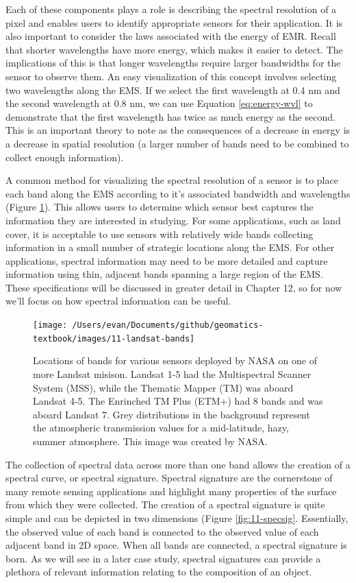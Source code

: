 \documentclass[
]{book}
\begin{document}
Each of these components plays a role is describing the spectral
resolution of a pixel and enables users to identify appropriate sensors
for their application. It is also important to consider the laws
associated with the energy of EMR. Recall that shorter wavelengths
have more energy, which makes it easier to detect. The implications
of this is that longer wavelengths require larger bandwidths for the
sensor to observe them. An easy visualization of this concept involves
selecting two wavelengths along the EMS. If we select the first
wavelength at 0.4 nm and the second wavelength at 0.8 nm, we can use
Equation \eqref{eq:energy-wvl} to demonstrate that the first wavelength
has twice as much energy as the second. This is an important theory
to note as the consequences of a decrease in energy is a decrease in
spatial resolution (a larger number of bands need to be combined to
collect enough information).

A common method for visualizing the spectral resolution of a sensor is
to place each band along the EMS according to it's associated bandwidth
and wavelengths (Figure \ref{fig:11-landsat-bands}). This allows users
to determine which sensor best captures the information they are
interested in studying. For some applications, such as land cover, it is
acceptable to use sensors with relatively wide bands collecting
information in a small number of strategic locations along the EMS. For
other applications, spectral information may need to be more detailed
and capture information using thin, adjacent bands spanning a large
region of the EMS. These specifications will be discussed in greater
detail in Chapter 12, so for now we'll focus on how spectral information
can be useful.

\begin{figure}
\texttt{[image: /Users/evan/Documents/github/geomatics-textbook/images/11-landsat-bands]} \caption{Locations of bands for various sensors deployed by NASA on one of more Landsat misison. Landsat 1-5 had the Multispectral Scanner System (MSS), while the Thematic Mapper (TM) was aboard Landsat 4-5. The Enrinched TM Plus (ETM+) had 8 bands and was aboard Landsat 7. Grey distributions in the background represent the atmospheric transmission values for a mid-latitude, hazy, summer atmosphere. This image was created by NASA.}\label{fig:11-landsat-bands}
\end{figure}

The collection of spectral data across more than one band allows the
creation of a spectral curve, or spectral signature. Spectral signature
are the cornerstone of many remote sensing applications and highlight
many properties of the surface from which they were collected. The
creation of a spectral signature is quite simple and can be depicted in
two dimensions (Figure \ref{fig:11-specsig}. Essentially, the observed
value of each band is connected to the observed value of each adjacent
band in 2D space. When all bands are connected, a spectral signature is
born. As we will see in a later case study, spectral signatures can
provide a plethora of relevant information relating to the composition
of an object.
\end{document}
